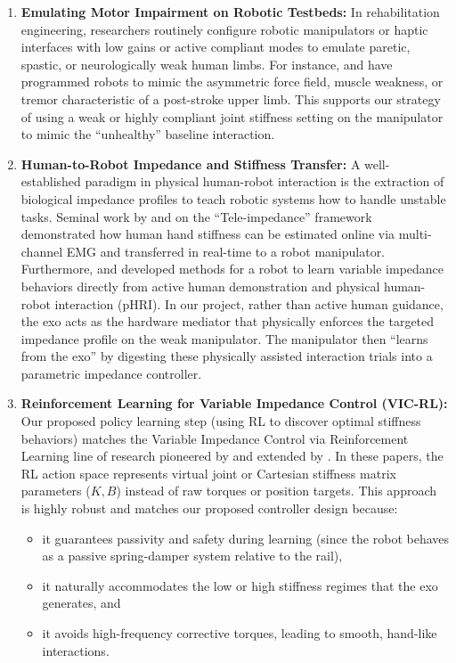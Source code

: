\documentclass[11pt, a4paper]{article}
\begin{document}
\begin{enumerate}
  \item \textbf{Emulating Motor Impairment on Robotic Testbeds:}
  In rehabilitation engineering, researchers routinely configure robotic manipulators or haptic interfaces with low gains or active compliant modes to emulate paretic, spastic, or neurologically weak human limbs. For instance, \citet{casadio2006} and \citet{patinvoh2020} have programmed robots to mimic the asymmetric force field, muscle weakness, or tremor characteristic of a post-stroke upper limb. This supports our strategy of using a weak or highly compliant joint stiffness setting on the manipulator to mimic the ``unhealthy'' baseline interaction.

  \item \textbf{Human-to-Robot Impedance and Stiffness Transfer:}
  A well-established paradigm in physical human-robot interaction is the extraction of biological impedance profiles to teach robotic systems how to handle unstable tasks. Seminal work by \citet{ajoudani2012icra} and \citet{ajoudani2018springer} on the ``Tele-impedance'' framework demonstrated how human hand stiffness can be estimated online via multi-channel EMG and transferred in real-time to a robot manipulator. Furthermore, \citet{kronander2014} and \citet{rozo2015} developed methods for a robot to learn variable impedance behaviors directly from active human demonstration and physical human-robot interaction (pHRI). In our project, rather than active human guidance, the exo acts as the hardware mediator that physically enforces the targeted impedance profile on the weak manipulator. The manipulator then ``learns from the exo'' by digesting these physically assisted interaction trials into a parametric impedance controller.

  \item \textbf{Reinforcement Learning for Variable Impedance Control (VIC-RL):}
  Our proposed policy learning step (using RL to discover optimal stiffness behaviors) matches the Variable Impedance Control via Reinforcement Learning line of research pioneered by \citet{buchli2011} and extended by \citet{bogdanovic2020}. In these papers, the RL action space represents virtual joint or Cartesian stiffness matrix parameters ($K, B$) instead of raw torques or position targets. This approach is highly robust and matches our proposed controller design because:
  \begin{itemize}[nosep]
    \item it guarantees passivity and safety during learning (since the robot behaves as a passive spring-damper system relative to the rail),
    \item it naturally accommodates the low or high stiffness regimes that the exo generates, and
    \item it avoids high-frequency corrective torques, leading to smooth, hand-like interactions.
  \end{itemize}
\end{enumerate}
\end{document}
